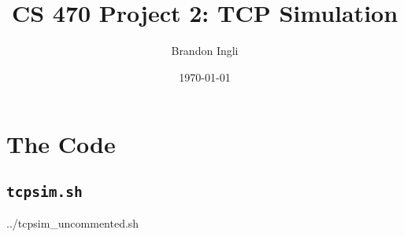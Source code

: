 \documentclass[11pt]{article}
\begin{document}
  \title{CS 470 Project 2: TCP Simulation}
  \author{Brandon Ingli}
  \date{\today}

  \maketitle
  \tableofcontents
  \listoffigures
  \clearpage

  \section{The Code}
  \subsection{\texttt{tcpsim.sh}}
  
  {../tcpsim_uncommented.sh} %
  
\end{document}
